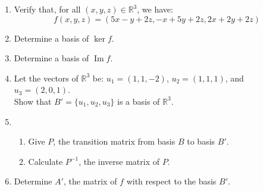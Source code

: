 \documentclass[12pt]{article}
\begin{document}
\begin{enumerate}
    \item Verify that, for all $(x,y,z) \in \mathbb{R}^3$, we have:
    \[f(x,y,z) = (5x - y + 2z, -x + 5y + 2z, 2x + 2y + 2z)\]

    \item Determine a basis of $\ker f$.

    \item Determine a basis of $\operatorname{Im} f$.

    \item Let the vectors of $\mathbb{R}^3$ be: $u_1 = (1,1,-2)$, $u_2 = (1,1,1)$, and $u_3 = (2,0,1)$. \\ 
    Show that $B' = \{u_1, u_2, u_3\}$ is a basis of $\mathbb{R}^3$.

    \item \begin{enumerate}
        \item Give $P$, the transition matrix from basis $B$ to basis $B'$.

        \item Calculate $P^{-1}$, the inverse matrix of $P$.
    \end{enumerate}

    \item Determine $A'$, the matrix of $f$ with respect to the basis $B'$.
\end{enumerate}

\newpage
\end{document}
